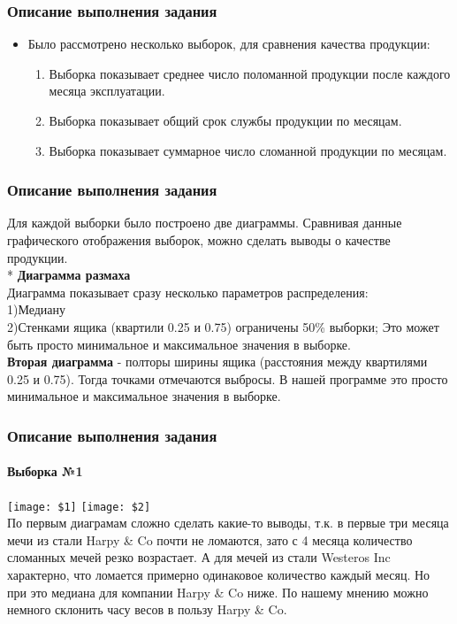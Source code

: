 	\begin{frame}
		\frametitle{Описание выполнения задания}
		\begin{itemize}
			\item<1-> Было рассмотрено несколько выборок, для сравнения качества продукции: 
			\begin{enumerate}
				\item Выборка показывает среднее число поломанной продукции после каждого месяца эксплуатации.
				\item Выборка показывает общий срок службы продукции по месяцам.
				\item Выборка показывает суммарное число сломанной продукции по месяцам.
			\end{enumerate}
		\end{itemize}
	\end{frame}
	\begin{frame}
		\frametitle{Описание выполнения задания}
		Для каждой выборки было построено две диаграммы. Сравнивая данные графического отображения выборок, можно сделать выводы о качестве продукции.
		\\*
		\textbf{Диаграмма размаха}\\
		Диаграмма показывает сразу несколько параметров распределения:\\
		1)Медиану\\
		2)Стенками ящика (квартили 0.25 и 0.75) ограничены 50\% выборки;
		Это может быть просто минимальное и максимальное значения в выборке.\\
		\textbf{Вторая диаграмма} - полторы ширины ящика (расстояния между квартилями 0.25 и 0.75). Тогда точками отмечаются выбросы. В нашей программе это просто минимальное и максимальное значения в выборке. 
	\end{frame}
	\begin{frame}[shrink=4]
		\frametitle{Описание выполнения задания}
		\framesubtitle{Выборка №1}

        \texttt{[image: \$1]}
        \texttt{[image: \$2]}\\
		По первым диаграмам сложно сделать какие-то выводы, т.к. в первые три месяца мечи из стали Harpy \& Co почти не ломаются, зато с 4 месяца количество сломанных мечей резко возрастает. А для мечей из стали Westeros Inc характерно, что ломается примерно одинаковое количество каждый месяц. Но при это медиана для компании Harpy \& Co ниже. По нашему мнению можно немного склонить часу весов в пользу Harpy \& Co.
	\end{frame}
